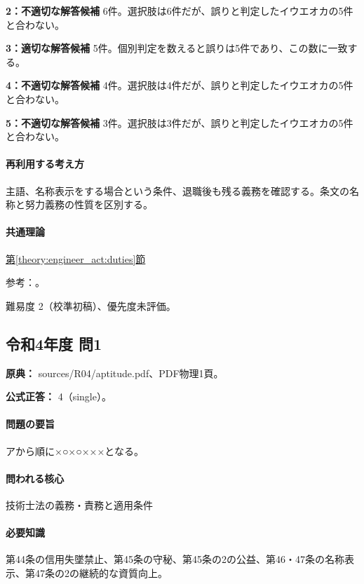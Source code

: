 \noindent\textbf{2：不適切な解答候補} 6件。選択肢は6件だが、誤りと判定したイウエオカの5件と合わない。\par

\noindent\textbf{3：適切な解答候補} 5件。個別判定を数えると誤りは5件であり、この数に一致する。\par

\noindent\textbf{4：不適切な解答候補} 4件。選択肢は4件だが、誤りと判定したイウエオカの5件と合わない。\par

\noindent\textbf{5：不適切な解答候補} 3件。選択肢は3件だが、誤りと判定したイウエオカの5件と合わない。\par

\paragraph{再利用する考え方} 主語、名称表示をする場合という条件、退職後も残る義務を確認する。条文の名称と努力義務の性質を区別する。

\paragraph{共通理論} \hyperref[theory:engineer_act:duties]{第\ref*{theory:engineer_act:duties}節}

\par 参考：\cite{engineer_act_current}。

\par 難易度 2（校準初稿）、優先度未評価。

\subsection{令和4年度 問1}
\label{q:r04-reg-apt-01}

\noindent\textbf{原典：} sources/R04/aptitude.pdf、PDF物理1頁。

\textbf{公式正答：} 4（single）。

\paragraph{問題の要旨} アから順に×○×○×××となる。

\paragraph{問われる核心} 技術士法の義務・責務と適用条件

\paragraph{必要知識} 第44条の信用失墜禁止、第45条の守秘、第45条の2の公益、第46・47条の名称表示、第47条の2の継続的な資質向上。

